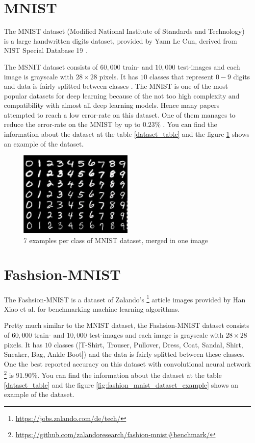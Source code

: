 \section{MNIST}
The MNIST dataset (Modified National Institute of Standards and Technology) is a large handwritten
digits dataset, provided by Yann Le Cun, derived from NIST Special Database 19 \cite{NIST}.

The MSNIT dataset consists of $60,000$ train- and $10,000$ test-images and each image is grayscale
with $28 \times 28$ pixels. It has $10$ classes that represent $0-9$ digits and data is fairly
splitted between classes \cite{MNIST_data_reference}. The MNIST is one of the most popular datasets for
deep learning because of the not too high complexity and compatibility with almost all deep learning
models. Hence many papers attempted to reach a low error-rate on this dataset. One of them manages
to reduce the error-rate on the MNIST by up to $0.23\%$ \cite{MNIST_best_result_reference}. You can
find the information about the dataset at the table
\ref{dataset_table} and the figure \ref{fig:mnist_dataset_example} shows an example of the dataset.

\begin{figure}
  \centering
  \label{fig:mnist_dataset_example}
  \includegraphics[width=0.5\textwidth]{fig/mnist}
  \caption{7 examples per class of MNIST dataset, merged in one image \cite{MNIST_dataset_example}}
\end{figure}


\section{Fashsion-MNIST}
The Fashsion-MNIST is a dataset of Zalando's \footnote{\url{https://jobs.zalando.com/de/tech/}}
article images provided by Han Xiao et al. \cite{Fashion_MNIST_reference} for benchmarking machine learning algorithms.

Pretty much similar to the MNIST dataset, the Fashsion-MNIST dataset consists of $60,000$ train- and $10,000$ test-images and each image is grayscale
with $28 \times 28$ pixels. It has $10$ classes ([T-Shirt, Trouser, Pullover, Dress, Coat,
    Sandal, Shirt, Sneaker, Bag, Ankle Boot]) and the data is fairly
splitted between these classes. One the best reported accuracy on this dataset with convolutional neural
network \footnote{\url{https://github.com/zalandoresearch/fashion-mnist\#benchmark/}} is $91.90\%$. You can
find the information about the dataset at the table
\ref{dataset_table} and the figure \ref{fig:fashion_mnist_dataset_example} shows an example of the dataset.


